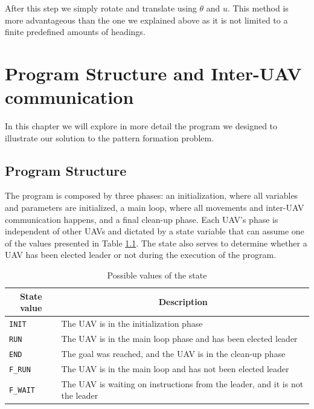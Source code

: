 After this step we simply rotate and translate using $\theta$ and $u$. This method is more advantageous than
the one we explained above as it is not limited to a finite predefined amounts of headings.

\chapter{Program Structure and Inter-UAV communication}

In this chapter we will explore in more detail the program we designed to illustrate our 
solution to the pattern formation problem.

\section{Program Structure}

The program is composed by three phases: an initialization, where all variables and parameters
are initialized, a main loop, where all movements and inter-UAV communication happens, and a 
final clean-up phase. Each UAV's phase is independent of other UAVs and dictated by a state 
variable that can assume one of the values presented in Table \ref{tab:states}. The state 
also serves to determine whether a UAV has been elected leader or not during the execution
of the program. 

\begin{table}
	\caption{Possible values of the state}\label{tab:states}
	\begin{center}
		\begin{tabular}[t]{l|l}
			\hline
			\multicolumn{1}{c|}{\textbf{State value}} & 
			\multicolumn{1}{c}{\textbf{Description}} \\
			\hline 
			\texttt{INIT} & The UAV is in the initialization phase \\
			\hline
			\texttt{RUN} & The UAV is in the main loop phase and has been elected leader \\
			\hline
			\texttt{END} & The goal was reached, and the UAV is in the clean-up phase \\
			\hline
			\texttt{F\_RUN} & The UAV is in the main loop and has not been elected leader \\
			\hline
			\texttt{F\_WAIT} & The UAV is waiting on instructions from the leader, and it is not the leader \\
			\hline
		\end{tabular}
	\end{center}
\end{table}


